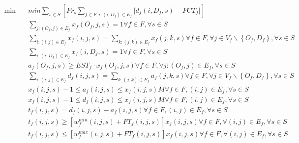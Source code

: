 \begin{align}
  \min\quad & min \sum_{s \in S} \left[\mathit{Pr}_{s} \sum_{f \in F, i : \left(i , D_{f}\right) \in E_{f}} \left|d_{f} \left(i , D_{f} , s\right) - \mathit{PCT}_{f}\right|\right] \tag{eq\_0001} \\
  & \sum_{j : \left(O_{f} , j\right) \in E_{f}} x_{f} \left(O_{f} , j , s\right) = 1 \forall f \in F , \forall s \in S \tag{eq\_0003} \\
  & \sum_{i : \left(i , j\right) \in E_{f}} x_{f} \left(i , j , s\right) = \sum_{k : \left(j , k\right) \in E_{f}} x_{f} \left(j , k , s\right) \forall f \in F , \forall j \in V_{f} \backslash \left\{O_{f} , D_{f}\right\} , \forall s \in S \tag{eq\_0004} \\
  & \sum_{i : \left(i , D_{f}\right) \in E_{f}} x_{f} \left(i , D_{f} , s\right) = 1 \forall f \in F , \forall s \in S \tag{eq\_0005} \\
  & a_{f} \left(O_{f} , j , s\right) \geq \mathit{EST}_{f} \cdot x_{f} \left(O_{f} , j , s\right) \forall f \in F , \forall j : \left(O_{f} , j\right) \in E_{f} , \forall s \in S \tag{eq\_0006} \\
  & \sum_{i : \left(i , j\right) \in E_{f}} d_{f} \left(i , j , s\right) = \sum_{k : \left(j , k\right) \in E_{f}} a_{f} \left(j , k , s\right) \forall f \in F , \forall j \in V_{f} \backslash \left\{O_{f} , D_{f}\right\} , \forall s \in S \tag{eq\_0007} \\
  & x_{f} \left(i , j , s\right) - 1 \leq a_{f} \left(i , j , s\right) \leq x_{f} \left(i , j , s\right) M \forall f \in F , \left(i , j\right) \in E_{f} , \forall s \in S \tag{eq\_0008} \\
  & x_{f} \left(i , j , s\right) - 1 \leq d_{f} \left(i , j , s\right) \leq x_{f} \left(i , j , s\right) M \forall f \in F , \left(i , j\right) \in E_{f} , \forall s \in S \tag{eq\_0009} \\
  & t_{f} \left(i , j , s\right) = d_{f} \left(i , j , s\right) - a_{f} \left(i , j , s\right) \forall f \in F , \left(i , j\right) \in E_{f} , \forall s \in S \tag{eq\_0010} \\
  & t_{f} \left(i , j , s\right) \geq \left[w_{f}^{\mathit{min}} \left(i , j , s\right) + \mathit{FT}_{f} \left(i , j , s\right)\right] x_{f} \left(i , j , s\right) \forall f \in F , \forall \left(i , j\right) \in E_{f} , \forall s \in S \tag{eq\_0011} \\
  & t_{f} \left(i , j , s\right) \leq \left[w_{f}^{\mathit{max}} \left(i , j , s\right) + \mathit{FT}_{f} \left(i , j , s\right)\right] x_{f} \left(i , j , s\right) \forall f \in F , \forall \left(i , j\right) \in E_{f} , \forall s \in S \tag{eq\_0012} \\

\end{align}
